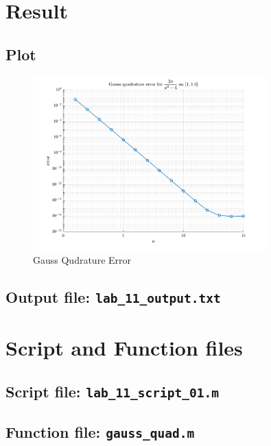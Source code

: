 \section{Result}
\subsection{Plot}
\begin{figure}[!hbtp]
    \centering
    \includegraphics[width=0.8\textwidth]{../src/lab_11_figure.pdf}
    \caption{Gauss Qudrature Error}
    \label{fig:my_label}
\end{figure}
\newpage
\subsection{Output file: \lstinline[style=Plain]{lab_11_output.txt}}

\newpage
\section{Script and Function files}
\subsection{Script file: \lstinline[style=Plain]{lab_11_script_01.m}}

\newpage
\subsection{Function file: \lstinline[style=Plain]{gauss_quad.m}}


